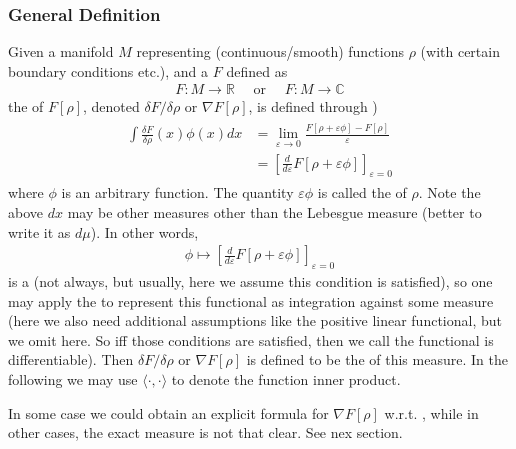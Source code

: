 \documentclass{article}
\begin{document}
\subsubsection{General Definition}
Given a manifold $M$ representing (continuous/smooth) functions $\rho$ (with certain boundary conditions etc.), and a  $F$ defined as
\begin{align*}
F: M \rightarrow \mathbb{R} \quad \text { or } \quad F: M \rightarrow \mathbb{C}
\end{align*}
the  of $F[\rho]$, denoted $\delta F / \delta \rho$ or $\nabla F[\rho]$, is defined through ) 
\begin{align*}
\begin{aligned}
\int \frac{\delta F}{\delta \rho}(x) \phi(x) d x &=\lim _{\varepsilon \rightarrow 0} \frac{F[\rho+\varepsilon \phi]-F[\rho]}{\varepsilon} \\
&=\left[\frac{d}{d \varepsilon} F[\rho+\varepsilon \phi]\right]_{\varepsilon=0}
\end{aligned}
\end{align*}
where $\phi$ is an arbitrary function. The quantity $\varepsilon \phi$ is called the  of $\rho$. Note the above $dx$ may be other measures other than the Lebesgue measure (better to write it as $d\mu$).
In other words,
\begin{align*}
\phi \mapsto\left[\frac{d}{d \varepsilon} F[\rho+\varepsilon \phi]\right]_{\varepsilon=0}
\end{align*}
is a  (not always, but usually, here we assume this condition is satisfied), so one may apply the  to represent this functional as integration against some measure (here we also need additional assumptions like the positive linear functional, but we omit here. So iff those conditions are satisfied, then we call the functional is differentiable).
Then $\delta F / \delta \rho$ or $\nabla F[\rho]$ is defined to be the  of this measure. In the following we may use $\langle\cdot, \cdot\rangle$ to denote the function inner product.
\begin{rema}
{In some case we could obtain an explicit formula for $\nabla F[\rho]$ w.r.t. , while in other cases, the exact measure is not that clear.} See nex section.
\end{rema}
\end{document}
